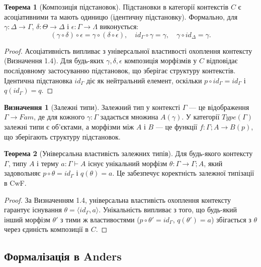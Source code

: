 \documentclass{article}
\theoremstyle{definition}
\newtheorem{definition}{Визначення}[section]
\newtheorem{theorem}{Теорема}[section]
\begin{document}
\begin{theorem}[Композиція підстановок]
Підстановки в категорії контекстів $C$ є асоціативними та мають одиницю (ідентичну підстановку). Формально, для $\gamma:\Delta\rightarrow\Gamma$, $\delta:\Theta\rightarrow\Delta$ і $\epsilon:\Gamma\rightarrow\Lambda$ виконується:
\[
    (\gamma \circ \delta) \circ \epsilon = \gamma \circ (\delta \circ \epsilon), \quad id_{\Gamma} \circ \gamma = \gamma, \quad \gamma \circ id_{\Delta} = \gamma.
\]
\end{theorem}

\begin{proof}
Асоціативність випливає з універсальної властивості охоплення контексту (Визначення 1.4). Для будь-яких $\gamma,\delta,\epsilon$ композиція морфізмів у $C$ відповідає послідовному застосуванню підстановок, що зберігає структуру контекстів. Ідентична підстановка $id_{\Gamma}$ діє як нейтральний елемент, оскільки $p \circ id_{\Gamma} = id_{\Gamma}$ і $q(id_{\Gamma}) = q$.
\end{proof}

\begin{definition}[Залежні типи]
Залежний тип у контексті $\Gamma$ --- це відображення $\Gamma \rightarrow Fam$, де для кожного $\gamma:\Gamma$ задається множина $A(\gamma)$. У категорії $Type(\Gamma)$ залежні типи є об’єктами, а морфізми між $A$ і $B$ --- це функції $f: \Gamma;A \rightarrow B(p)$, що зберігають структуру підстановок.
\end{definition}

\begin{theorem}[Універсальна властивість залежних типів]
Для будь-якого контексту $\Gamma$, типу $A$ і терму $a:\Gamma\vdash A$ існує унікальний морфізм $\theta:\Gamma \rightarrow \Gamma;A$, який задовольняє $p \circ \theta = id_{\Gamma}$ і $q(\theta) = a$. Це забезпечує коректність залежної типізації в CwF.
\end{theorem}

\begin{proof}
За Визначенням 1.4, універсальна властивість охоплення контексту гарантує існування $\theta = \langle id_{\Gamma}, a \rangle$. Унікальність випливає з того, що будь-який інший морфізм $\theta'$ з тими ж властивостями ($p \circ \theta' = id_{\Gamma}$, $q(\theta') = a$) збігається з $\theta$ через єдиність композиції в $C$.
\end{proof}

\newpage
\subsection{Формалізація в Anders}
\end{document}
